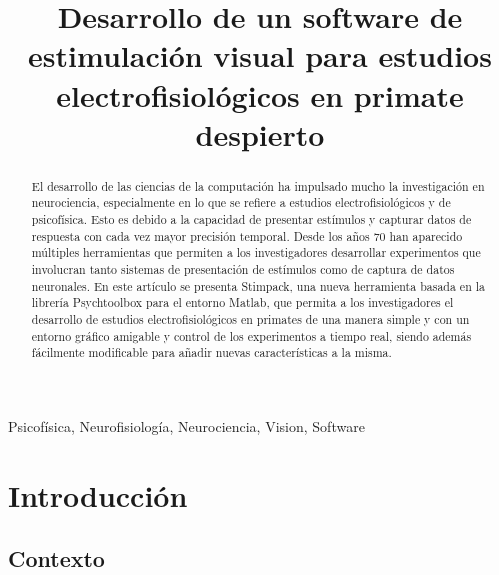 \documentclass[conference]{IEEEtran}
\begin{document}
\title{Desarrollo de un software de estimulación visual para estudios electrofisiológicos en primate
despierto\\
}

\author{

}

\maketitle

\begin{abstract}

El desarrollo de las ciencias de la computación ha impulsado mucho la investigación en neurociencia, especialmente en lo que se refiere a estudios electrofisiológicos y de psicofísica. Esto es debido a la capacidad de presentar estímulos y capturar datos de respuesta con cada vez mayor precisión temporal. Desde los años 70 han aparecido múltiples herramientas que permiten a los investigadores desarrollar experimentos que involucran tanto sistemas de presentación de estímulos como de captura de datos neuronales. En este artículo se presenta Stimpack, una nueva herramienta basada en la librería Psychtoolbox para el entorno Matlab, que permita a los investigadores el desarrollo de estudios electrofisiológicos en primates de una manera simple y con un entorno gráfico amigable y control de los experimentos a tiempo real, siendo además fácilmente modificable para añadir nuevas características a la misma. 

\end{abstract}
\begin{IEEEkeywords}
Psicofísica, Neurofisiología, Neurociencia, Vision, Software
\end{IEEEkeywords}

\section{Introducción}
\subsection{Contexto}


\end{document}
